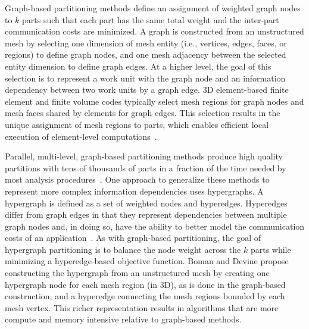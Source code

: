 Graph-based partitioning methods define an assignment of weighted graph
nodes to $k$ parts such that each part has the same total weight and the
inter-part communication costs are minimized.
A graph is constructed from an unstructured mesh by selecting one dimension of mesh
entity (i.e., vertices, edges, faces, or regions) to define graph nodes, and one mesh
adjacency between the selected entity dimension to define graph edges.
At a higher level, the goal of this selection is to represent a work unit with
the graph node and an information dependency between two work units by a graph
edge.
3D element-based finite element and finite volume codes typically select mesh
regions for graph nodes and mesh faces shared by elements for graph edges.
This selection results in the unique assignment of mesh regions to parts,
which enables efficient local execution of element-level
computations~\cite{hughes2012finite}.

Parallel, multi-level, graph-based partitioning methods produce
high quality partitions with tens of thousands of parts in a fraction of the
time needed by most analysis
procedures~\cite{catalyurek2013umpa,karypis1999parallel, lasalle2013multi,
schloegel2002parallel}.
One approach to generalize these methods to represent more complex information
dependencies uses hypergraphs.
A hypergraph is defined as a set of weighted nodes and hyperedges.
Hyperedges differ from graph edges in that they represent dependencies
between multiple graph nodes and, in doing so, have the ability to better
model the communication costs of an
application~\cite{catalyurek1999hypergraph,catalyurek2009repartitioning}.
As with graph-based partitioning, the goal of hypergraph partitioning is to
balance the node weight across the $k$ parts while minimizing a
hyperedge-based objective function.
Boman and Devine propose constructing the hypergraph from an unstructured mesh
by creating one hypergraph node for each mesh region (in 3D), as is done in the
graph-based construction, and a hyperedge connecting the mesh regions
bounded by each mesh vertex.  %
This richer representation results in algorithms that are more compute and memory
intensive relative to graph-based methods.
